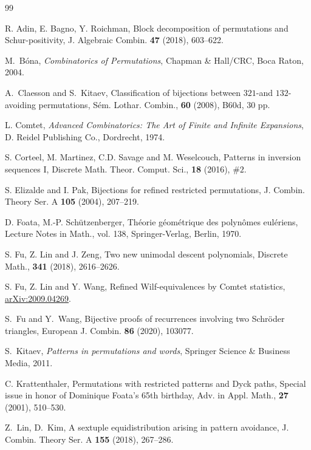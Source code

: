 \documentclass[12pt]{amsart}
\numberwithin{equation}{section}
\theoremstyle{plain}
\theoremstyle{definition}
\begin{document}
\begin{thebibliography}{99}

 R. Adin, E. Bagno, Y. Roichman, Block decomposition of permutations and Schur-positivity, J. Algebraic Combin. {\bf47} (2018), 603--622.

 M.~B\'ona, {\em Combinatorics of Permutations}, Chapman \& Hall/CRC, Boca Raton, 2004.

 A.~Claesson and S.~Kitaev, Classification of bijections between $321$-and $132$-avoiding permutations, S\'em. Lothar. Combin., {\bf 60} (2008), B60d, 30 pp.



 L. Comtet, {\em Advanced Combinatorics: The Art of Finite and Infinite Expansions}, D. Reidel Publishing Co., Dordrecht, 1974.

 S. Corteel, M. Martinez, C.D. Savage and M. Weselcouch, Patterns in inversion sequences I,  Discrete Math. Theor. Comput. Sci., {\bf18} (2016),  $\#2$.



 S. Elizalde and I. Pak, Bijections for refined restricted permutations, J. Combin. Theory Ser. A {\bf105} (2004), 207--219.

 D. Foata, M.-P. Sch\"utzenberger, Th\'eorie g\'eom\'etrique des polyn\^omes eul\'eriens, Lecture Notes in Math., vol. 138, Springer-Verlag, Berlin, 1970.



 S. Fu, Z. Lin and J. Zeng, Two new unimodal descent polynomials, Discrete Math., {\bf341} (2018),  2616--2626.

 S. Fu, Z. Lin and Y. Wang, Refined Wilf-equivalences by Comtet statistics, \href{https://arxiv.org/abs/2009.04269}{arXiv:2009.04269}.

 S.~Fu and Y.~Wang, Bijective proofs of recurrences involving two Schr\"oder triangles, European J. Combin. {\bf86} (2020), 103077.

 S.~Kitaev, {\em Patterns in permutations and words}, Springer Science \& Business Media, 2011. 



C. Krattenthaler, Permutations with restricted patterns and Dyck paths, 
Special issue in honor of Dominique Foata's 65th birthday, Adv. in Appl. Math., {\bf27} (2001), 510--530.

 Z.~Lin, D.~Kim, A sextuple equidistribution arising in pattern avoidance, J. Combin. Theory Ser. A {\bf 155} (2018), 267--286.


\end{thebibliography}
\end{document}
